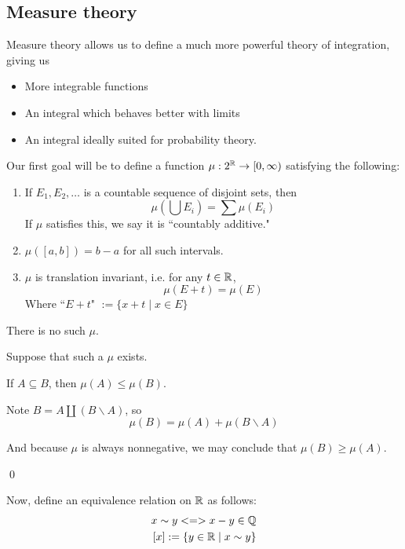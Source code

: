 \documentclass[x11names,reqno,14pt]{extarticle}
\begin{document}
\subsection*{Measure theory}

Measure theory allows us to define a much more powerful theory of integration, giving us 
\begin{itemize}
\item More integrable functions
\item An integral which behaves better with limits
\item An integral ideally suited for probability theory. 
\end{itemize}

Our first goal will be to define a function $\mu:2^{\mathbb{R}}\to[0,\infty)$ satisfying the following:

\begin{enumerate}
\item If $E_1, E_2, \dots$ is a countable sequence of disjoint sets, then 
\[
\mu\left(\bigcup E_i \right) = \sum\mu(E_i)
\]
If $\mu$ satisfies this, we say it is ``countably additive."

\item $\mu([a, b]) = b - a$ for all such intervals. 

\item $\mu$ is translation invariant, i.e. for any $t \in \mathbb{R}$, 
\[
\mu(E + t) = \mu(E)
\]
Where ``$E + t$" $:=\{x + t \mid x \in E\}$
\end{enumerate}

 There is no such $\mu$.



\proof

Suppose that such a $\mu$ exists. 

\claim

If $A \subseteq B$, then $\mu(A) \leq \mu(B)$.

\proof

Note $B = A \coprod (B \backslash A)$, so 
\[
\mu(B) = \mu(A) + \mu(B \backslash A)
\]

And because $\mu$ is always nonnegative, we may conclude that $\mu(B) \geq \mu(A)$. 

\qed

Now, define an equivalence relation on $\mathbb{R}$ as follows:
\begin{align*}
x \sim y <=> x - y \in \mathbb{Q} \\
[x] := \{y \in \mathbb{R} \mid x \sim y\}
\end{align*}
\end{document}
